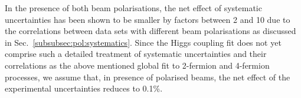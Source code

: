 \begin{itemize}
In the presence of both beam polarisations, the net effect of systematic uncertainties has been shown to be smaller by factors between 2 and 10 due to the correlations between data sets with different beam polarisations as discussed in Sec.~\ref{subsubsec:pol:systematics}. Since the Higgs coupling fit does not yet comprise such a detailed treatment of systematic uncertainties and their correlations as the above mentioned global fit to 2-fermion and 4-fermion processes, we assume that, in presence of polarised beams, the net effect of the experimental uncertainties reduces to 0.1\%.
\end{itemize}




